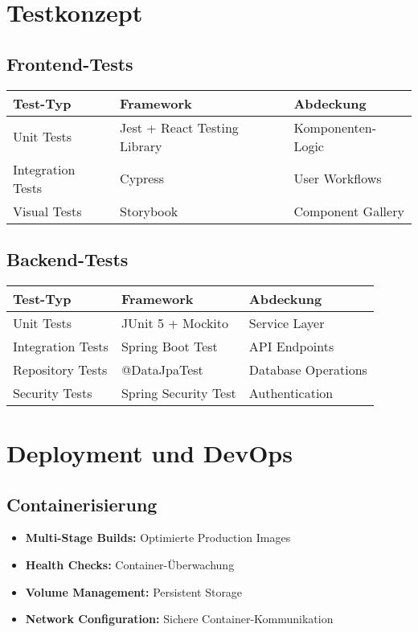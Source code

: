 \documentclass[a4paper,12pt]{article}
\begin{document}
\section{Testkonzept}

\subsection{Frontend-Tests}
\begin{longtable}{|p{}|p{}|p{}|}
\hline
\textbf{Test-Typ} & \textbf{Framework} & \textbf{Abdeckung} \\
\hline
Unit Tests & Jest + React Testing Library & Komponenten-Logic \\
\hline
Integration Tests & Cypress & User Workflows \\
\hline
Visual Tests & Storybook & Component Gallery \\
\hline
\end{longtable}

\subsection{Backend-Tests}
\begin{longtable}{|p{}|p{}|p{}|}
\hline
\textbf{Test-Typ} & \textbf{Framework} & \textbf{Abdeckung} \\
\hline
Unit Tests & JUnit 5 + Mockito & Service Layer \\
\hline
Integration Tests & Spring Boot Test & API Endpoints \\
\hline
Repository Tests & @DataJpaTest & Database Operations \\
\hline
Security Tests & Spring Security Test & Authentication \\
\hline
\end{longtable}

\section{Deployment und DevOps}

\subsection{Containerisierung}
\begin{itemize}
    \item \textbf{Multi-Stage Builds:} Optimierte Production Images
    \item \textbf{Health Checks:} Container-Überwachung
    \item \textbf{Volume Management:} Persistent Storage
    \item \textbf{Network Configuration:} Sichere Container-Kommunikation
\end{itemize}
\end{document}
